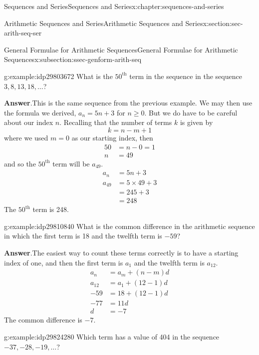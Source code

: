 \documentclass[twoside,10pt,]{book}
\newcommand{\blocktitlefont}{\relax}
\numberwithin{equation}{section}
\newcommand{\upth}[1]{{#1^{\text{th}}}}
\newcommand{\amp}{&}
\begin{document}
\begin{chapterptx}{Sequences and Series}{}{Sequences and Series}{}{}{x:chapter:sequences-and-series}
\begin{sectionptx}{Arithmetic Sequences and Series}{}{Arithmetic Sequences and Series}{}{}{x:section:sec-arith-seq-ser}
\begin{subsectionptx}{General Formulae for Arithmetic Sequences}{}{General Formulae for Arithmetic Sequences}{}{}{x:subsection:ssec-genform-arith-seq}
 \begin{example}{}{g:example:idp29803672}%
What is the \(\upth{50}\) term in the sequence in the sequence \(3, 8, 13, 18, \ldots\)?\par\smallskip%
\noindent\textbf{\blocktitlefont Answer}.\label{g:answer:idp29801368}{}\hypertarget{g:answer:idp29801368}{}\quad{}This is the same sequence from the previous example.  We may then use the  formula we derived, \(a_n = 5n + 3\) for \(n \ge 0\).  But we do have to be careful about our index \(n\).  Recalling that the number of terms \(k\) is given by%
\begin{equation*}
k=n-m+1
\end{equation*}
where we used \(m = 0\) as our starting index, then%
\begin{align*}
50 \amp = n-0=1\\
n\amp = 49
\end{align*}
and so the \(\upth{50}\) term will be \(a_{49}\).%
\begin{align*}
a_n \amp = 5n + 3\\
a_{49} \amp = 5 \times 49 + 3\\
\amp = 245 + 3\\
\amp =248
\end{align*}
The \(\upth{50}\) term is 248.\end{example}
 \begin{example}{}{g:example:idp29810840}%
What is the common difference in the arithmetic sequence in which the first term is 18 and the twelfth term is \(-59\)?\par\smallskip%
\noindent\textbf{\blocktitlefont Answer}.\label{g:answer:idp29815064}{}\hypertarget{g:answer:idp29815064}{}\quad{}The easiest way to count these terms correctly is to have a starting index of one, and then the first term is \(a_1\) and the twelfth term is \(a_{12}\).%
\begin{align*}
a_n \amp = a_m + \left( n - m \right)d\\
a_{12} \amp = a_1 + \left( 12 - 1 \right)d\\
-59 \amp = 18 + \left( 12 - 1 \right)d\\
-77 \amp = 11d\\
d\amp = -7
\end{align*}
The common difference is \(-7\).\end{example}
 \begin{example}{}{g:example:idp29824280}%
Which term has a value of 404 in the sequence \(-37, -28, -19, \ldots\)?\par\smallskip%

\end{example}
\end{subsectionptx}
\end{sectionptx}
\end{chapterptx}
\end{document}
